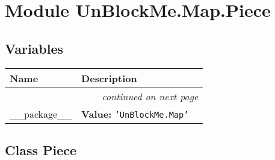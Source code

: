 %
%
%


\section{Module UnBlockMe.Map.Piece}

    \label{UnBlockMe:Map:Piece}


  \subsection{Variables}

    \vspace{-1cm}
\hspace{\varindent}\begin{longtable}{|p{\varnamewidth}|p{\vardescrwidth}|l}
\cline{1-2}
\cline{1-2} \centering \textbf{Name} & \centering \textbf{Description}& \\
\cline{1-2}
\endhead\cline{1-2}\multicolumn{3}{r}{\small\textit{continued on next page}}\\\endfoot\cline{1-2}
\endlastfoot\raggedright \_\-\_\-p\-a\-c\-k\-a\-g\-e\-\_\-\_\- & \raggedright \textbf{Value:} 
{\tt \texttt{'}\texttt{UnBlockMe.Map}\texttt{'}}&\\
\cline{1-2}
\end{longtable}



\subsection{Class Piece}

